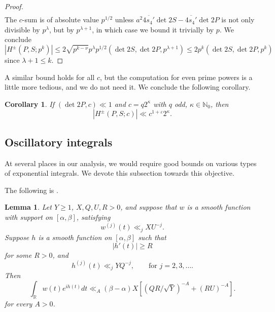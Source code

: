 \documentclass[11pt]{amsart}
\numberwithin{equation}{section}
\theoremstyle{plain}
\newtheorem{cor}[theorem]{Corollary}
\newtheorem{lemma}{Lemma}
\theoremstyle{definition}
\renewcommand{\geq}{\geqslant}
\renewcommand{\leq}{\le}
\numberwithin{equation}{section}
\begin{document}
\begin{proof}
\begin{align}
\end{align}
The $c$-sum is of absolute value $p^{1/2}$ unless $  a^2  \overline{4s_4'}\det 2S  -   \overline{4s_4'}  \det 2P $ is not only divisible by $p^{\lambda}$, but by $p^{\lambda+1}$, in which case we bound it trivially by $p$.  We conclude
$$|H^{\pm}(P, S;p^k)| \leq 2\sqrt{p^ {k-\nu}}  p^{\lambda} p^{1/2}  (\det 2S, \det 2P, p^{\lambda+1}) \leq 2 p^k (\det 2S, \det 2P, p^k)$$
since $\lambda+1 \leq k$. 
%
\end{proof}

A similar bound holds for all $c$, but the computation for even prime powers is a little more tedious, and we do not need it. We conclude the following corollary.
\begin{cor}\label{cor1} If $(\det 2P, c) \ll 1$ and $c = q 2^{\kappa}$ with $q$ odd, $\kappa \in \mathbb{N}_0$, then
$$|H^{\pm}(P, S; c)| \ll c^{1+\varepsilon}2^{\kappa}.  $$
 \end{cor}

\subsection{Oscillatory integrals}
At several places in our analysis, we would require good bounds on various types of exponential integrals. We devote this subsection towards this objective.

The following is \cite[Lemma 8.1]{BKY}.
\begin{lemma} \label{integrationbyparts}
 Let $Y \geq 1$, $X, Q, U, R > 0$, %
and suppose that $w$ %
 is a smooth function with support on $[\alpha, \beta]$, satisfying
\begin{equation*}
w^{(j)}(t) \ll_j X U^{-j}.
\end{equation*}
Suppose $h$ %
  is a smooth function on $[\alpha, \beta]$ such that
\begin{equation}
 |h'(t)| \geq R
\end{equation}
for some $R > 0$, and
\begin{equation}\label{diffh0}
h^{(j)}(t) \ll_j Y Q^{-j}, \qquad \text{for } j=2, 3, \dots.
\end{equation}
Then  
\begin{equation*}
 \int_{\mathbb{R}} w(t) e^{i h(t)} dt  \ll_A (\beta - \alpha) X [(QR/\sqrt{Y})^{-A} + (RU)^{-A}].
\end{equation*}
for every $A > 0$. 
\end{lemma}
\end{document}
